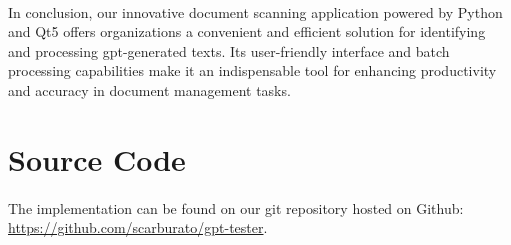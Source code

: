 \paragraph{}
In conclusion, our innovative document scanning application powered by Python and Qt5 offers organizations a 
convenient and efficient solution for identifying and processing gpt-generated texts. Its user-friendly 
interface and batch processing capabilities make it an indispensable tool for enhancing productivity and accuracy 
in document management tasks.

\section{Source Code}
\paragraph{}
The implementation can be found on our git repository hosted on Github: \url{https://github.com/scarburato/gpt-tester}.